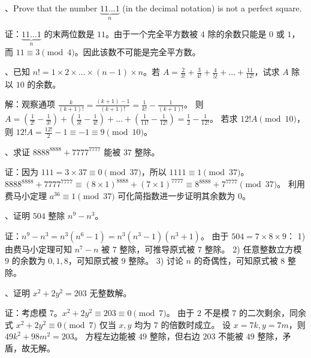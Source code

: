 \begin{questions}
、Prove that the number $\underbrace{11\dots1}_{n}$ (in the decimal notation) is not a perfect square.

\begin{solution}
证：$\underbrace{11\dots1}_{n}$ 的末两位数是 $11$。由于一个完全平方数被 $4$ 除的余数只能是 $0$ 或 $1$，而 $11 \equiv 3 \pmod 4$。因此该数不可能是完全平方数。
\end{solution}

、已知 $n! = 1 \times 2 \times \dots \times (n-1) \times n$。若 $A = \frac{2}{3!} + \frac{3}{4!} + \frac{4}{5!} + \dots + \frac{11}{12!}$，试求 $A$ 除以 $10$ 的余数。

\begin{solution}
解：观察通项 $\frac{k}{(k+1)!} = \frac{(k+1)-1}{(k+1)!} = \frac{1}{k!} - \frac{1}{(k+1)!}$。
则 $A = (\frac{1}{2!} - \frac{1}{3!}) + (\frac{1}{3!} - \frac{1}{4!}) + \dots + (\frac{1}{11!} - \frac{1}{12!}) = \frac{1}{2} - \frac{1}{12!}$。
若求 $12! A \pmod{10}$，则 $12! A = \frac{12!}{2} - 1 \equiv -1 \equiv 9 \pmod{10}$。
\end{solution}

、求证 $8888^{8888} + 7777^{7777}$ 能被 $37$ 整除。

\begin{solution}
证：因为 $111 = 3 \times 37 \equiv 0 \pmod{37}$，所以 $1111 \equiv 1 \pmod{37}$。
$8888^{8888} + 7777^{7777} \equiv (8 \times 1)^{8888} + (7 \times 1)^{7777} \equiv 8^{8888} + 7^{7777} \pmod{37}$。
利用费马小定理 $a^{36} \equiv 1 \pmod{37}$ 可化简指数进一步证明其余数为 $0$。
\end{solution}

、证明 $504$ 整除 $n^9 - n^3$。

\begin{solution}
证：$n^9 - n^3 = n^3(n^6 - 1) = n^3(n^3 - 1)(n^3 + 1)$。
由于 $504 = 7 \times 8 \times 9$：
1) 由费马小定理可知 $n^7 - n$ 被 $7$ 整除，可推导原式被 $7$ 整除。
2) 任意整数立方模 $9$ 的余数为 $0, 1, 8$，可知原式被 $9$ 整除。
3) 讨论 $n$ 的奇偶性，可知原式被 $8$ 整除。
\end{solution}

、证明 $x^2 + 2y^2 = 203$ 无整数解。

\begin{solution}
证：考虑模 $7$。$x^2 + 2y^2 \equiv 203 \equiv 0 \pmod 7$。
由于 $2$ 不是模 $7$ 的二次剩余，同余式 $x^2 + 2y^2 \equiv 0 \pmod 7$ 仅当 $x, y$ 均为 $7$ 的倍数时成立。
设 $x=7k, y=7m$，则 $49k^2 + 98m^2 = 203$。
方程左边能被 $49$ 整除，但右边 $203$ 不能被 $49$ 整除，矛盾，故无解。
\end{solution}


\end{questions}
